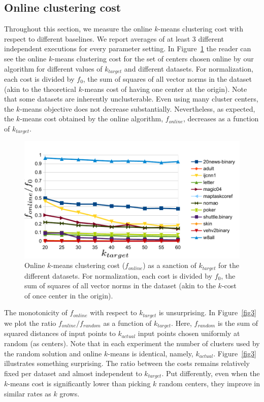 \documentclass[11pt,twoside]{article}
\begin{document}
\subsection{Online clustering cost}
Throughout this section, we measure the online $k$-means clustering cost with respect to different baselines. We report averages of at least 3 different independent executions for every parameter setting.
In Figure~\ref{fig2} the reader can see the online $k$-means clustering cost for the set of centers chosen online by our algorithm for different values of $k_{target}$ and different datasets.
For normalization, each cost is divided by $f_0$, the sum of squares of all vector norms in the dataset (akin to the theoretical $k$-means cost of having one center at the origin).
Note that some datasets are inherently unclusterable. Even using many cluster centers, the $k$-means objective does not decrease substantially.
Nevertheless, as expected, the $k$-means cost obtained by the online algorithm, $f_{online}$, decreases as a function of $k_{target}$. 

\begin{figure}[htbp]
\begin{center}
\includegraphics{figures/plot2.pdf}
\caption{Online $k$-means clustering cost ($f_{online}$) as a sanction of $k_{target}$ for the different datasets.
For normalization, each cost is divided by $f_0$, the sum of squares of all vector norms in the dataset (akin to the $k$-cost of once center in the origin).}
\label{fig2}
\end{center}
\end{figure}

The monotonicity of $f_{online}$ with respect to $k_{target}$ is unsurprising.
In Figure~\ref{fig3} we plot the ratio $f_{online}/f_{random}$ as a function of $k_{target}$.
Here, $f_{random}$ is the sum of squared distances of input points to $k_{actual}$  input points chosen uniformly at random (as centers).
Note that in each experiment the number of clusters used by the random solution and online $k$-means is identical, namely, $k_{actual}$.
Figure~\ref{fig3} illustrates something surprising. The ratio between the costs remains relatively fixed per dataset and almost independent to $k_{target}$.
Put differently, even when the $k$-means cost is significantly lower than picking $k$ random centers, they improve in similar rates as $k$ grows.
\end{document}
